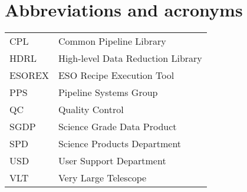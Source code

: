 \section{Abbreviations and acronyms}
\label{ABBREVIATIONS}



\begin{tabular}{ll}
CPL    & Common Pipeline Library\\
HDRL   & High-level Data Reduction Library\\
ESOREX & ESO Recipe Execution Tool\\
PPS    & Pipeline Systems Group\\
QC     & Quality Control \\
SGDP   & Science Grade Data Product\\
SPD    & Science Products Department\\
USD    & User Support Department\\
VLT    & Very Large Telescope \\
\end{tabular}

